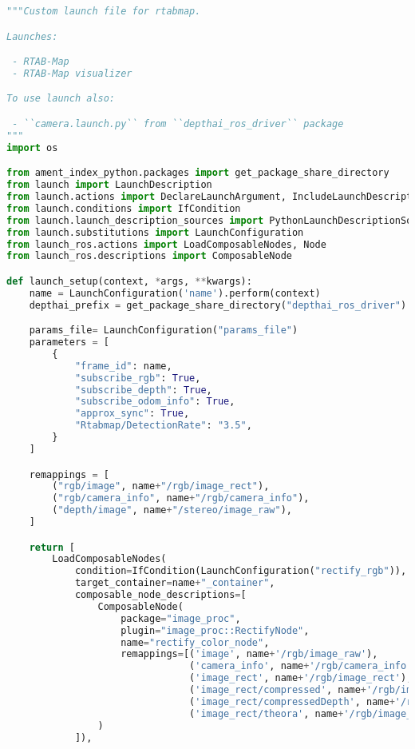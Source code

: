 \begin{lstlisting}[language=python,frame=single]
"""Custom launch file for rtabmap.

Launches:

 - RTAB-Map
 - RTAB-Map visualizer

To use launch also:

 - ``camera.launch.py`` from ``depthai_ros_driver`` package
"""
import os

from ament_index_python.packages import get_package_share_directory
from launch import LaunchDescription
from launch.actions import DeclareLaunchArgument, IncludeLaunchDescription, OpaqueFunction
from launch.conditions import IfCondition
from launch.launch_description_sources import PythonLaunchDescriptionSource
from launch.substitutions import LaunchConfiguration
from launch_ros.actions import LoadComposableNodes, Node
from launch_ros.descriptions import ComposableNode

def launch_setup(context, *args, **kwargs):
    name = LaunchConfiguration('name').perform(context)
    depthai_prefix = get_package_share_directory("depthai_ros_driver")

    params_file= LaunchConfiguration("params_file")
    parameters = [
        {
            "frame_id": name,
            "subscribe_rgb": True,
            "subscribe_depth": True,
            "subscribe_odom_info": True,
            "approx_sync": True,
            "Rtabmap/DetectionRate": "3.5",
        }
    ]

    remappings = [
        ("rgb/image", name+"/rgb/image_rect"),
        ("rgb/camera_info", name+"/rgb/camera_info"),
        ("depth/image", name+"/stereo/image_raw"),
    ]

    return [
        LoadComposableNodes(
            condition=IfCondition(LaunchConfiguration("rectify_rgb")),
            target_container=name+"_container",
            composable_node_descriptions=[
                ComposableNode(
                    package="image_proc",
                    plugin="image_proc::RectifyNode",
                    name="rectify_color_node",
                    remappings=[('image', name+'/rgb/image_raw'),
                                ('camera_info', name+'/rgb/camera_info'),
                                ('image_rect', name+'/rgb/image_rect'),
                                ('image_rect/compressed', name+'/rgb/image_rect/compressed'),
                                ('image_rect/compressedDepth', name+'/rgb/image_rect/compressedDepth'),
                                ('image_rect/theora', name+'/rgb/image_rect/theora')]
                )
            ]),
        

\end{lstlisting}
